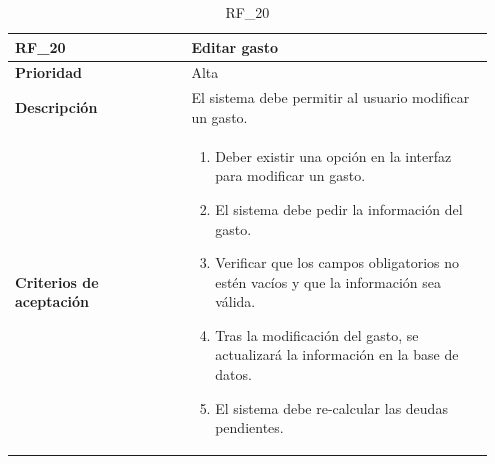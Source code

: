 \begin{table}[htb!]
    \begin{tabular}{|p{0.35\linewidth}|p{0.6\linewidth}|}
        \hline
        \rowcolor[HTML]{C0C0C0}  
        \textbf{RF\_20} & \textbf{Editar gasto} \\
        \hline
        \textbf{Prioridad} & Alta \\
        \hline
        \textbf{Descripción} & El sistema debe permitir al usuario modificar un gasto.  \\
        \hline
        \vspace{0.5mm}
        \textbf{Criterios de aceptación} & 
        \begin{minipage}[t]{0.9\linewidth}
            \begin{enumerate}
                \item Deber existir una opción en la interfaz para modificar un gasto.
                \item El sistema debe pedir la información del gasto.
                \item Verificar que los campos obligatorios no estén vacíos y que la información sea válida.
                \item Tras la modificación del gasto, se actualizará la información en la base de datos.
                \item El sistema debe re-calcular las deudas pendientes.
            \end{enumerate}
            \vspace{2mm}
        \end{minipage} \\
        \hline
    \end{tabular}
    \caption{RF\_20}
    \label{req:RF20}
\end{table}

